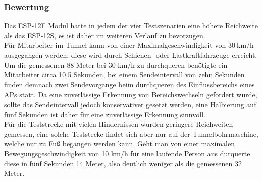 \subsubsection{Bewertung}
\label{ch:Reichweite:sec:bewertung}
Das ESP-12F Modul hatte in jedem der vier Testszenarien eine höhere Reichweite als das ESP-12S, es ist daher im weiteren Verlauf zu bevorzugen.\\
Für Mitarbeiter im Tunnel kann von einer Maximalgeschwindigkeit von $30\ $km/h ausgegangen werden, diese wird durch Schienen- oder Lastkraftfahrzeuge erreicht. 
Um die gemessenen 88 Meter bei 30 km/h zu durchqueren benötigte ein Mitarbeiter circa 10,5 Sekunden, bei einem Sendeintervall von zehn Sekunden finden demnach zwei Sendevorgänge beim durchqueren des Einflussbereichs eines APs statt.
Da eine zuverlässige Erkennung von Bereichswechseln gefordert wurde, sollte das Sendeintervall jedoch konservativer gesetzt werden, eine Halbierung auf fünf Sekunden ist daher für eine zuverlässige Erkennung sinnvoll.
\\
Für die Teststrecke mit vielen Hindernissen wurden geringere Reichweiten gemessen, eine solche Teststecke findet sich aber nur auf der Tunnelbohrmaschine, welche nur zu Fuß begangen werden kann. 
Geht man von einer maximalen Bewegungsgeschwindigkeit von 10 km/h für eine laufende Person aus durquerte diese in fünf Sekunden 14 Meter, also deutlich weniger als die gemessenen 32 Meter.\\





